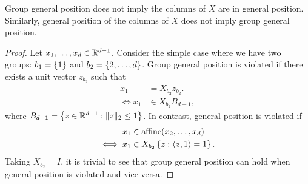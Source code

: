 \begin{proposition}\label{prop:general-position-relation}
	Group general position does not imply
	the columns of \( X \) are in general position.
	Similarly, general position of the columns of \( X \) does not imply
	group general position.
\end{proposition}
\begin{proof}
	Let \( x_1, \ldots, x_{d} \in \mathbb{R}^{d-1} \).
	Consider the simple case where we have two groups: \( b_1 = \left\{1\right\} \)
	and \( b_2 = \left\{2, \ldots, d\right\} \).
	Group general position is violated if there exists a unit vector \( z_{b_2} \)
	such that
	\begin{align*}
		x_{1}
		 & = X_{b_2} z_{b_2}.   \\
		\iff x_1
		 & \in X_{b_2} B_{d-1},
	\end{align*}
	where \( B_{d-1} = \left\{z \in \mathbb{R}^{d-1} : \|z\|_2 \leq 1\right\} \).
	In contrast, general position is violated if
	\begin{align*}
		x_1
		 & \in \text{affine}(x_2, \ldots, x_{d}) \\
		\iff x_1
		 & \in X_{b_2} \left\{z : \left\langle z, 1\right\rangle = 1\right\}.
	\end{align*}
	Taking \( X_{b_2} = I \), it is trivial to see that group general position can
	hold when general position is violated and vice-versa.
\end{proof}
